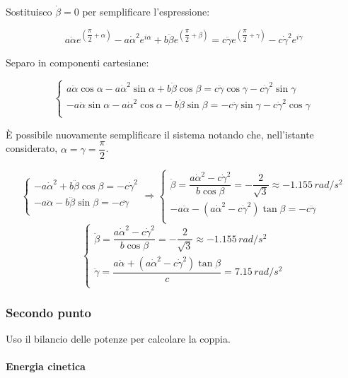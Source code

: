 \documentclass[main.tex]{subfiles}
\begin{document}
Sostituisco $\dot{\beta}=0$ per semplificare l'espressione:

\[
a\ddot{\alpha}e^{\left( \dfrac{\pi}{2} + \alpha \right )} - a\dot{\alpha}^2e^{i\alpha} + b\ddot{\beta}e^{\left( \dfrac{\pi}{2} + \beta \right )}=  c\ddot{\gamma}e^{\left( \dfrac{\pi}{2} + \gamma \right )}  - c\dot{\gamma}^2e^{i\gamma}
\]

Separo in componenti cartesiane:

\[
\begin{cases}
a\ddot{\alpha}\cos\alpha - a\dot{\alpha}^2\sin\alpha + b\ddot{\beta}\cos\beta = c\ddot{\gamma}\cos\gamma - c\dot{\gamma}^2\sin\gamma\\
-a\ddot{\alpha}\sin\alpha - a\dot{\alpha}^2\cos\alpha - b\ddot{\beta}\sin\beta = -c\ddot{\gamma}\sin\gamma - c\dot{\gamma}^2\cos\gamma\\
\end{cases}
\]

È possibile nuovamente semplificare il sistema notando che, nell'istante considerato, $\alpha = \gamma = \dfrac{\pi}{2}$.

\[
\begin{cases}
- a\dot{\alpha}^2 + b\ddot{\beta}\cos\beta =  - c\dot{\gamma}^2\\
-a\ddot{\alpha} - b\ddot{\beta}\sin\beta = -c\ddot{\gamma}\\
\end{cases}
\Longrightarrow
\begin{cases}
\ddot{\beta} =  \dfrac{a\dot{\alpha}^2 - c\dot{\gamma}^2}{b\cos\beta} = -\dfrac{2}{\sqrt{3}} \approx -1.155\,rad/s^2\\
-a\ddot{\alpha} - (a\dot{\alpha}^2 - c\dot{\gamma}^2)\tan\beta = -c\ddot{\gamma}\\
\end{cases}
\]
\[
\begin{cases}
\ddot{\beta} =  \dfrac{a\dot{\alpha}^2 - c\dot{\gamma}^2}{b\cos\beta} = -\dfrac{2}{\sqrt{3}} \approx -1.155\,rad/s^2\\
\ddot{\gamma} = \dfrac{a\ddot{\alpha} + (a\dot{\alpha}^2 - c\dot{\gamma}^2)\tan\beta}{c} = 7.15\,rad/s^2\\
\end{cases}
\]

\subsubsection{Secondo punto}
Uso il bilancio delle potenze per calcolare la coppia.

\paragraph{Energia cinetica}
\end{document}
